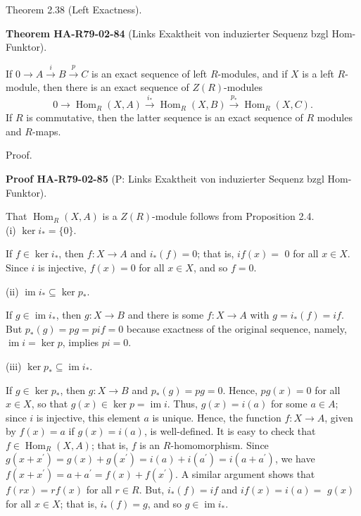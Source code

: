 \documentclass[10pt, letterpaper]{article}
\newcommand{\CustomHeading}[3]{%
  \par\medskip\noindent%
  \textbf{#1 #2} \textnormal{(#3)}.\enskip%
}
\newenvironment{THEO}[2]{\begin{unitbox}\CustomHeading{Theorem}{#1}{#2}}{\end{unitbox}}
\newenvironment{PROOF}[2]{\begin{unitbox}\CustomHeading{Proof}{#1}{#2}}{\end{unitbox}}
\begin{document}
Theorem 2.38 (Left Exactness). 

\begin{THEO}{HA-R79-02-84}{Links Exaktheit von induzierter Sequenz bzgl Hom-Funktor}
If $0 \rightarrow A \xrightarrow{i} B \xrightarrow{p} C$ is an exact sequence of left $R$-modules, and if $X$ is a left $R$-module, then there is an exact sequence of $Z(R)$-modules
$$
0 \rightarrow \operatorname{Hom}_{R}(X, A) \xrightarrow{i_{*}} \operatorname{Hom}_{R}(X, B) \xrightarrow{p_{*}} \operatorname{Hom}_{R}(X, C) .
$$
If $R$ is commutative, then the latter sequence is an exact sequence of $R$ modules and $R$-maps.
\end{THEO}

Proof. 

\begin{PROOF}{HA-R79-02-85}{P: Links Exaktheit von induzierter Sequenz bzgl Hom-Funktor}
That $\operatorname{Hom}_{R}(X, A)$ is a $Z(R)$-module follows from Proposition 2.4.\\

(i) $\operatorname{ker} i_{*}=\{0\}$.

If $f \in \operatorname{ker} i_{*}$, then $f: X \rightarrow A$ and $i_{*}(f)=0$; that is, $i f(x)=$ 0 for all $x \in X$. Since $i$ is injective, $f(x)=0$ for all $x \in X$, and so $f=0$.

(ii) $\operatorname{im} i_{*} \subseteq \operatorname{ker} p_{*}$.

If $g \in \operatorname{im} i_{*}$, then $g: X \rightarrow B$ and there is some $f: X \rightarrow A$ with $g=i_{*}(f)=i f$. But $p_{*}(g)=p g=p i f=0$ because exactness of the original sequence, namely, $\operatorname{im} i=\operatorname{ker} p$, implies $p i=0$.

(iii) $\operatorname{ker} p_{*} \subseteq \operatorname{im} i_{*}$.

If $g \in \operatorname{ker} p_{*}$, then $g: X \rightarrow B$ and $p_{*}(g)=p g=0$. Hence, $p g(x)=0$ for all $x \in X$, so that $g(x) \in \operatorname{ker} p=\operatorname{im} i$. Thus, $g(x)=i(a)$ for some $a \in A$; since $i$ is injective, this element $a$ is unique. Hence, the function $f: X \rightarrow A$, given by $f(x)=a$ if $g(x)=i(a)$, is well-defined. It is easy to check that $f \in \operatorname{Hom}_{R}(X, A)$; that is, $f$ is an $R$-homomorphism. Since $g\left(x+x^{\prime}\right)=g(x)+g\left(x^{\prime}\right)=i(a)+i\left(a^{\prime}\right)=i\left(a+a^{\prime}\right)$, we have $f\left(x+x^{\prime}\right)=a+a^{\prime}=f(x)+f\left(x^{\prime}\right)$. A similar argument shows that $f(r x)=r f(x)$ for all $r \in R$. But, $i_{*}(f)=i f$ and $i f(x)=i(a)=$ $g(x)$ for all $x \in X$; that is, $i_{*}(f)=g$, and so $g \in \operatorname{im} i_{*}$.
\end{PROOF}
\end{document}
